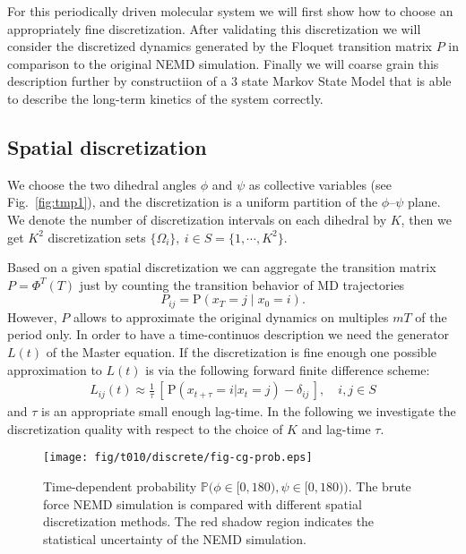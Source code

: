 \documentclass[aps, pre, preprint,unsortedaddress,a4paper,onecolumn]{revtex4}
\newcommand{\vect}[1]{#1}
\newcommand{\myphi}{\Phi}
\newcommand{\prob}{\textrm{P}}
\begin{document}
For this periodically driven molecular system we will first show how to choose an appropriately fine discretization. After validating this discretization we will consider
the discretized dynamics generated by the Floquet transition matrix $\vect P$
in comparison to the original NEMD simulation. Finally we will coarse grain this description further by constructiion of a $3$ state Markov State Model that is able to describe the long-term kinetics of the system correctly. 

\subsection{Spatial discretization}

We choose the
two dihedral angles $\phi$ and $\psi$ as collective variables (see
Fig.~\ref{fig:tmp1}), and the discretization is a uniform partition of
the $\phi$--$\psi$ plane. We denote the number of discretization intervals on each
dihedral by $K$, then we get $K^2$ discretization sets 
$\{\Omega_i\},\ i\in S = \{1,\cdots,K^2\}$.

Based on a given spatial discretization we can aggregate the transition matrix $\vect P=\myphi^T(T)$ just by counting the transition behavior of MD trajectories 
\[
\vect P_{ij}=\prob\left(\vect x_T=j\mid \vect x_0=i \right).
\]
However, $\vect P$ allows to approximate the original dynamics on multiples $mT$ of the period only. In order to have a time-continuos description we need the generator $L(t)$ of the Master equation. 
If the discretization is fine enough one possible approximation to $L(t)$ is via
the following forward finite difference scheme:
\begin{align}
  \label{eqn:tmp4}
  L_{ij}(t) \approx \frac{1}{\tau}
  \,[\, \prob (\vect x_{t+\tau} = i \vert \vect x_{t} = j) - \delta_{ij} \,],
  \quad i,j\in S
\end{align}
and $\tau$ is an appropriate small enough lag-time.
In the following 
we investigate the discretization
quality with respect to  the choice of $K$ and  lag-time $\tau$.





\begin{figure}
  \centering
  \texttt{[image: fig/t010/discrete/fig-cg-prob.eps]}  
  \caption{Time-dependent probability $\mathbb
    P\big(\phi\in[0,180), \psi\in [0,180)\big)$.  The brute force NEMD simulation is compared with different
    spatial discretization methods. The red shadow region indicates the
    statistical uncertainty of the NEMD simulation.}
  \label{fig:tmp2}
\end{figure}
\end{document}
